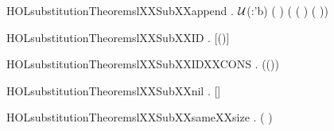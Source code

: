 \newcommand{\HOLsubstitutionTheoremsINSERTXXINSERTXXDELETE}{\UseVerbatim{HOLsubstitutionTheoremsINSERTXXINSERTXXDELETE}}
\begin{SaveVerbatim}{HOLsubstitutionTheoremslXXSubXXappend}
\HOLTokenTurnstile{} \HOLSymConst{\HOLTokenForall{}}  .
      \ensuremath{\cal{U}}(:'b) \HOLSymConst{\HOLTokenImp{}}
       ( ) \HOLSymConst{\HOLTokenImp{}}
     ( ( \HOLSymConst{++} )  \HOLSymConst{=}   (  ))
\end{SaveVerbatim}
\newcommand{\HOLsubstitutionTheoremslXXSubXXappend}{\UseVerbatim{HOLsubstitutionTheoremslXXSubXXappend}}
\begin{SaveVerbatim}{HOLsubstitutionTheoremslXXSubXXID}
\HOLTokenTurnstile{} \HOLSymConst{\HOLTokenForall{}}.  [(\HOLSymConst{,})]  \HOLSymConst{=} 
\end{SaveVerbatim}
\newcommand{\HOLsubstitutionTheoremslXXSubXXID}{\UseVerbatim{HOLsubstitutionTheoremslXXSubXXID}}
\begin{SaveVerbatim}{HOLsubstitutionTheoremslXXSubXXIDXXCONS}
\HOLTokenTurnstile{} \HOLSymConst{\HOLTokenForall{}} .  ((\HOLSymConst{,})\HOLSymConst{::})  \HOLSymConst{=}   
\end{SaveVerbatim}
\newcommand{\HOLsubstitutionTheoremslXXSubXXIDXXCONS}{\UseVerbatim{HOLsubstitutionTheoremslXXSubXXIDXXCONS}}
\begin{SaveVerbatim}{HOLsubstitutionTheoremslXXSubXXnil}
\HOLTokenTurnstile{} \HOLSymConst{\HOLTokenForall{}}.  []  \HOLSymConst{=} 
\end{SaveVerbatim}
\newcommand{\HOLsubstitutionTheoremslXXSubXXnil}{\UseVerbatim{HOLsubstitutionTheoremslXXSubXXnil}}
\begin{SaveVerbatim}{HOLsubstitutionTheoremslXXSubXXsameXXsize}
\HOLTokenTurnstile{} \HOLSymConst{\HOLTokenForall{}} .  (  ) \HOLSymConst{=}  
\end{SaveVerbatim}
\newcommand{\HOLsubstitutionTheoremslXXSubXXsameXXsize}{\UseVerbatim{HOLsubstitutionTheoremslXXSubXXsameXXsize}}
